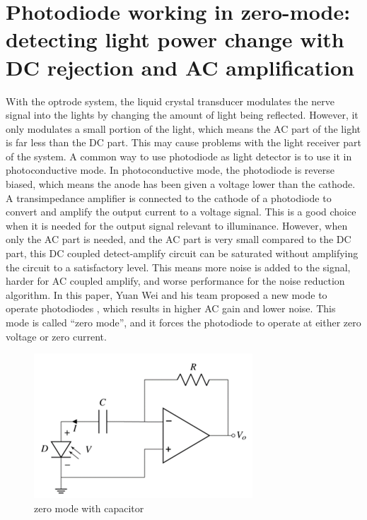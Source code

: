 \section{Photodiode working in zero-mode: detecting light power change with DC rejection and AC amplification}

With the optrode system, the liquid crystal transducer modulates the nerve signal into the lights by changing the amount of light being reflected.  However, it only modulates a small portion of the light, which means the AC part of the light is far less than the DC part.  This may cause problems with the light receiver part of the system.
A common way to use photodiode as light detector is to use it in photoconductive mode.  In photoconductive mode, the photodiode is reverse biased, which means the anode has been given a voltage lower than the cathode.  A transimpedance amplifier is connected to the cathode of a photodiode to convert and amplify the output current to a voltage signal.  This is a good choice when it is needed for the output signal relevant to illuminance.  However, when only the AC part is needed, and the AC part is very small compared to the DC part, this DC coupled detect-amplify circuit can be saturated without amplifying the circuit to a satisfactory level.  This means more noise is added to the signal, harder for AC coupled amplify, and worse performance for the noise reduction algorithm.
In this paper, Yuan Wei and his team proposed a new mode to operate photodiodes \cite{zero-mode_detection}, which results in higher AC gain and lower noise.  This mode is called “zero mode”, and it forces the photodiode to operate at either zero voltage or zero current.  

\begin{figure}[htbp]
\centerline{\includegraphics[scale=0.01]{zero_mode_sch.png}}
\caption{zero mode with capacitor}
\label{fig_zero_mode_sch}
\end{figure}

